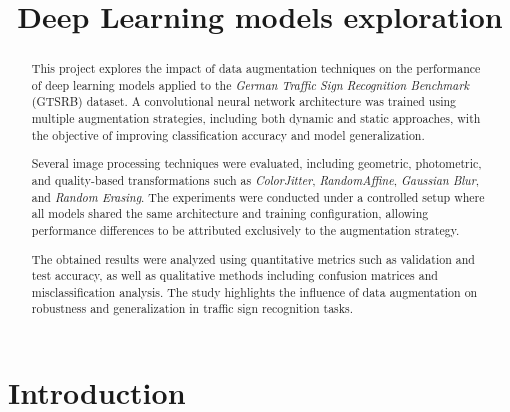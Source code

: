 \documentclass[conference]{IEEEtran}
\begin{document}
\title{
Deep Learning models exploration
}

\author{
\and
{}
}

\maketitle

\begin{abstract}

This project explores the impact of data augmentation techniques on the performance of deep learning models applied to the \textit{German Traffic Sign Recognition Benchmark} (GTSRB) dataset. A convolutional neural network architecture was trained using multiple augmentation strategies, including both dynamic and static approaches, with the objective of improving classification accuracy and model generalization.

Several image processing techniques were evaluated, including geometric, photometric, and quality-based transformations such as \textit{ColorJitter}, \textit{RandomAffine}, \textit{Gaussian Blur}, and \textit{Random Erasing}. The experiments were conducted under a controlled setup where all models shared the same architecture and training configuration, allowing performance differences to be attributed exclusively to the augmentation strategy.

The obtained results were analyzed using quantitative metrics such as validation and test accuracy, as well as qualitative methods including confusion matrices and misclassification analysis. The study highlights the influence of data augmentation on robustness and generalization in traffic sign recognition tasks.

\end{abstract}




\section{Introduction}
\end{document}
